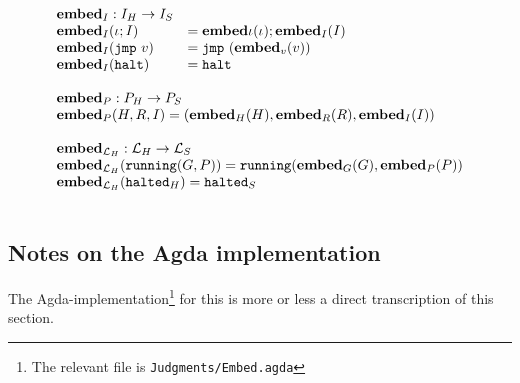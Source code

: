 {\[\begin{array}{l}
\begin{array}{ll}
{\ensuremath{\mathbf{embed}}}_I : {I_H} -> {I_S} \\
{\mathbf{embed}}_I(\iota ; I) &= {\mathbf{embed}}{\iota}(\iota) ; {\mathbf{embed}}_I(I) \\
{\mathbf{embed}}_I(\mathtt{jmp}\ v) &= \mathtt{jmp}\ ({\mathbf{embed}}_v(v)) \\
{\mathbf{embed}}_I(\mathtt{halt}) &= \mathtt{halt}
\end{array} \\\\

\begin{array}{l}
{\ensuremath{\mathbf{embed}}}_P : {P_H} -> {P_S} \\
{\mathbf{embed}}_P(H, R, I) = ({\mathbf{embed}}_H(H), {\mathbf{embed}}_R(R), {\mathbf{embed}}_I(I)) \\\\

{\mathbf{embed}}_{\mathcal{L}_H} : \mathcal{L}_H -> \mathcal{L}_S \\
{\mathbf{embed}}_{\mathcal{L}_H}(\mathtt{running}(G, P)) = \mathtt{running}({\mathbf{embed}}_G(G), {\mathbf{embed}}_P(P)) \\
{\mathbf{embed}}_{\mathcal{L}_H}({\mathtt{halted}_H}) = {\mathtt{halted}_S} \\
\end{array} \\\\

\end{array}\]
}

\subsection{Notes on the Agda implementation}

The Agda-implementation\footnote{The relevant file is
  \texttt{Judgments/Embed.agda}} for this is more or less a direct transcription
of this section.
